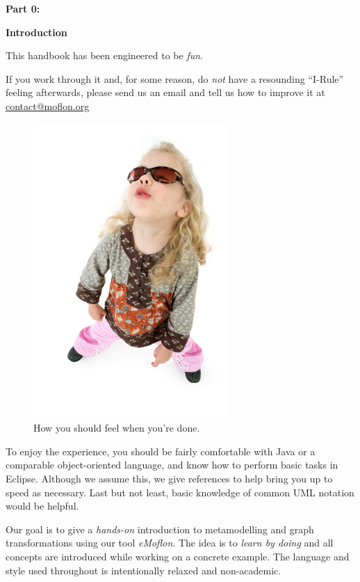 \genHeader

{\bf \huge Part 0:}

\vspace{0.8cm}

{\bf \Huge Introduction }

\vspace{2cm}


This handbook has been engineered to be \emph{fun}.

If you work through it and, for some reason, do \emph{not} have a resounding \mbox{``I-Rule''} feeling afterwards, please send us an email and tell us how to improve it at \href{mailto:contact@moflon.org}{contact@moflon.org}

\begin{figure}[htp]
\begin{center}
	\includegraphics[height=0.45\textheight]{../introduction_images/i-rule}
	\caption{How you should feel when you're done.}
	\label{i-rule}
\end{center}
\end{figure}
\break
 

To enjoy the experience, you should be fairly comfortable with Java or a comparable object-oriented language, and know how to perform basic tasks in Eclipse.  Although we assume this, we give references to help bring you up to speed as necessary. Last but not least, basic knowledge of common UML notation would be helpful.

Our goal is to give a \emph{hands-on} introduction to metamodelling and graph transformations using our tool \emph{eMoflon}. The idea is to \emph{learn by doing} and all concepts are introduced while working on a concrete example. The language and style used throughout is intentionally relaxed and non-academic.


